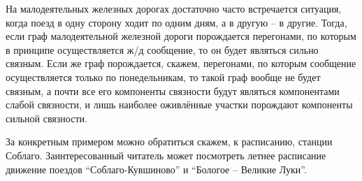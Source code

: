 \begin{example}
	На малодеятельных железных дорогах достаточно часто встречается ситуация, когда поезд в одну сторону ходит по одним дням, а в другую -- в другие. Тогда, если граф малодеятельной железной дороги порождается перегонами, по которым в принципе осуществляется ж/д сообщение, то он будет являться сильно связным. Если же граф порождается, скажем, перегонами, по которым сообщение осуществляется только по понедельникам, то такой граф вообще не будет связным, а почти все его компоненты связности будут являться компонентами слабой связности, и лишь наиболее оживлённые участки порождают компоненты сильной связности.
	
	За конкретным примером можно обратиться скажем, к расписанию, станции Соблаго. Заинтересованный читатель может посмотреть летнее расписание движение поездов ``Соблаго-Кувшиново'' и ``Бологое -- Великие Луки''.
\end{example}